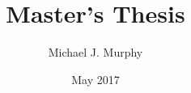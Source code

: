 \documentclass[12pt,a4paper,two-side]{book}
\begin{document}
\title{Master's Thesis}
\author{Michael J. Murphy}
\date{May 2017}
\maketitle



\frontmatter



\tableofcontents
\listoffigures



\mainmatter















\backmatter

\printbibliography[heading=bibintoc]
\end{document}
